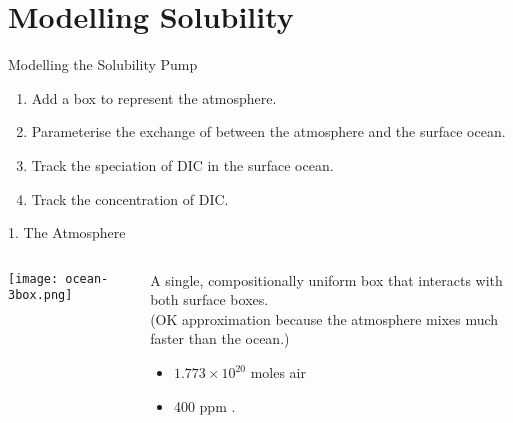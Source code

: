 \documentclass[aspectratio=169]{beamer}
\begin{document}
\section{Modelling Solubility}

\begin{frame}{Modelling the Solubility Pump}

\begin{enumerate}
    \item Add a box to represent the atmosphere.
    \item Parameterise the exchange of  between the atmosphere and the surface ocean.
    \item Track the speciation of DIC in the surface ocean.
    \item Track the concentration of DIC.
\end{enumerate}

\end{frame}


\begin{frame}{1. The Atmosphere}

    \begin{columns}
        \begin{column}{0.6\linewidth}
            \texttt{[image: ocean-3box.png]}
        \end{column}   
        \begin{column}{0.35\linewidth}
            A single, compositionally uniform box that interacts with both surface boxes. \\
            \tiny (OK approximation because the atmosphere mixes much faster than the ocean.) 
            
            \normalsize\bigskip
            \begin{itemize}
                \item $1.773 \times 10^{20}$ moles air
                \item 400 ppm .
            \end{itemize}
        \end{column} 
    \end{columns}
    
\end{frame}
\end{document}

